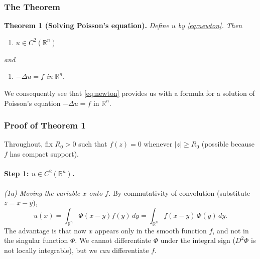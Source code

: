 \documentclass[11pt]{article}
\theoremstyle{plain}
\theoremstyle{definition}
\theoremstyle{remark}
\begin{document}
\subsubsection{The Theorem}
\textbf{Theorem 1 (Solving Poisson's equation).} \textit{Define $u$ by \eqref{eq:newton}. Then}
\begin{enumerate}
    \item[(i)] $u \in C^2(\mathbb{R}^n)$
\end{enumerate}
\textit{and}
\begin{enumerate}
    \item[(ii)] $-\Delta u = f$ \textit{in} $\mathbb{R}^n$.
\end{enumerate}

We consequently see that \eqref{eq:newton} provides us with a formula for a solution of Poisson's equation $-\Delta u = f$ in $\mathbb{R}^n$.

\subsubsection{Proof of Theorem 1}
Throughout, fix $R_0 > 0$ such that $f(z) = 0$ whenever $|z| \geq R_0$ (possible because $f$ has compact support).

\paragraph{Step 1: $u \in C^2(\mathbb{R}^n)$.}

\textit{(1a) Moving the variable $x$ onto $f$.} By commutativity of convolution (substitute $z = x - y$),
$$ u(x) = \int_{\mathbb{R}^n} \Phi(x-y) f(y)\, dy = \int_{\mathbb{R}^n} f(x-y)\, \Phi(y)\, dy. $$
The advantage is that now $x$ appears only in the smooth function $f$, and not in the singular function $\Phi$. We cannot differentiate $\Phi$ under the integral sign ($D^2\Phi$ is not locally integrable), but we \emph{can} differentiate $f$.
\end{document}
